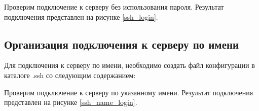 Проверим подключение к серверу без использования пароля. Результат подключения представлен на рисунке \ref{ssh_login}.


\subsection{Организация подключения к серверу по имени}

Для подключения к серверу по имени, необходимо создать файл конфигурации в каталоге .ssh со следующим содержанием:


Проверим подключение к серверу по указанному имени. Результат подключения представлен на рисунке \ref{ssh_name_login}.

